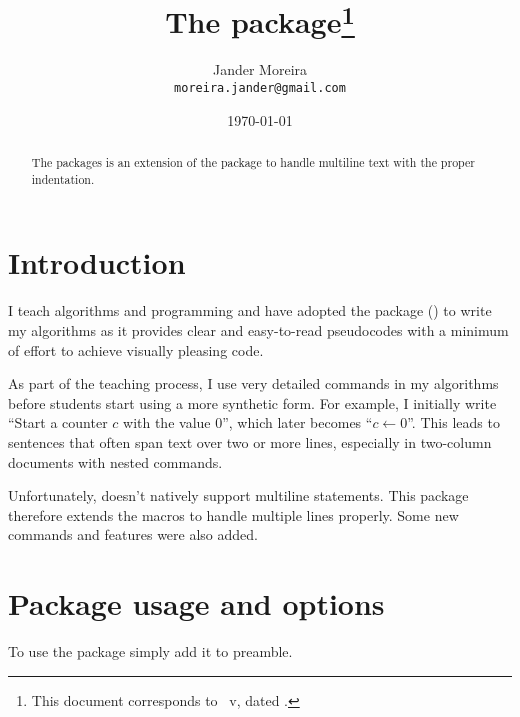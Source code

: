 \documentclass[a4paper, 11pt]{article}
\title{The \PackageName{algxpar} package\thanks{This document corresponds to \PackageName{algxpar}~v\AlgVersion, dated \AlgDate.}}
\author{Jander Moreira\\\texttt{moreira.jander@gmail.com}}
\date{\today}
\begin{document}
\maketitle
\sloppy

\begin{abstract}
    The  packages is an extension of the  package to handle multiline text with the proper indentation.
\end{abstract}

\tableofcontents
\vspace{2em}



\section{Introduction}
I teach algorithms and programming and have adopted the  package () to write my algorithms as it provides clear and easy-to-read pseudocodes with a minimum of effort to achieve visually pleasing code.

As part of the teaching process, I use very detailed commands in my algorithms before students start using a more synthetic form. For example, I initially write ``Start a counter $c$ with the value $0$'', which later becomes ``${c \gets 0}$''. This leads to sentences that often span text over two or more lines, especially in two-column documents with nested commands.

Unfortunately,  doesn't natively support multiline statements. This package therefore extends the macros to handle multiple lines properly. Some new commands and features were also added.


\section{Package usage and options}
To use the package simply add it to preamble.

\end{document}
